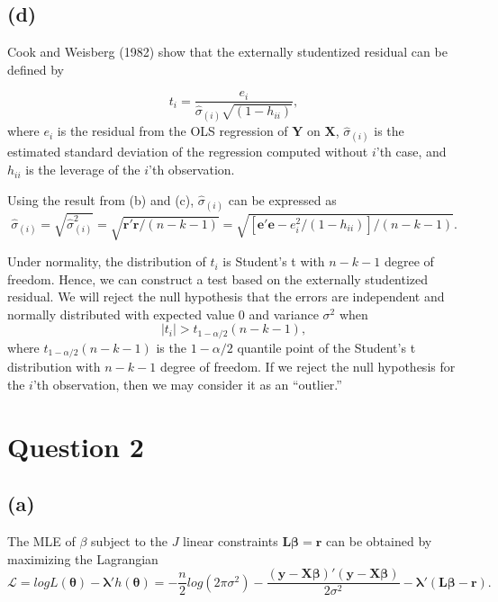 \documentclass[
]{article}
\begin{document}
\hypertarget{d}{%
\subsection{(d)}\label{d}}

Cook and Weisberg (1982) show that the externally studentized residual
can be defined by

\[t_i = \frac{e_i}{\hat{\sigma}_{(i)}\sqrt{(1-h_{ii})}},\] where \(e_i\)
is the residual from the OLS regression of \(\boldsymbol{Y}\) on
\(\boldsymbol{X}\), \(\hat{\sigma}_{(i)}\) is the estimated standard
deviation of the regression computed without \(i\)'th case, and
\(h_{ii}\) is the leverage of the \(i\)'th observation.

Using the result from (b) and (c), \(\hat{\sigma}_{(i)}\) can be
expressed as
\[\hat{\sigma}_{(i)} = \sqrt{\hat{\sigma}_{(i)}^2} = \sqrt{\boldsymbol{r}'\boldsymbol{r}/(n-k-1)} = \sqrt{[\boldsymbol{e}'\boldsymbol{e} - e_i^2/(1-h_{ii})]/(n-k-1)}.\]

Under normality, the distribution of \(t_i\) is Student's t with
\(n-k-1\) degree of freedom. Hence, we can construct a test based on the
externally studentized residual. We will reject the null hypothesis that
the errors are independent and normally distributed with expected value
\(0\) and variance \(\sigma^2\) when \[|t_i| > t_{1-\alpha/2}(n-k-1),\]
where \(t_{1-\alpha/2}(n-k-1)\) is the \(1-\alpha/2\) quantile point of
the Student's t distribution with \(n-k-1\) degree of freedom. If we
reject the null hypothesis for the \(i\)'th observation, then we may
consider it as an ``outlier.''

\hypertarget{question-2}{%
\section{Question 2}\label{question-2}}

\hypertarget{a-1}{%
\subsection{(a)}\label{a-1}}

The MLE of \(\beta\) subject to the \(J\) linear constraints
\(\boldsymbol{L}\boldsymbol{\beta} = \boldsymbol{r}\) can be obtained by
maximizing the Lagrangian
\[\mathcal{L} = logL(\boldsymbol{\theta}) - \boldsymbol{\lambda}'h(\boldsymbol{\theta}) = -\frac{n}{2}log(2\pi\sigma^2)-\frac{(\boldsymbol{y}-\boldsymbol{X}\boldsymbol{\beta})'(\boldsymbol{y}-\boldsymbol{X}\boldsymbol{\beta})}{2\sigma^2}-\boldsymbol{\lambda}'(\boldsymbol{L}\boldsymbol{\beta}-\boldsymbol{r}).\]
\end{document}
